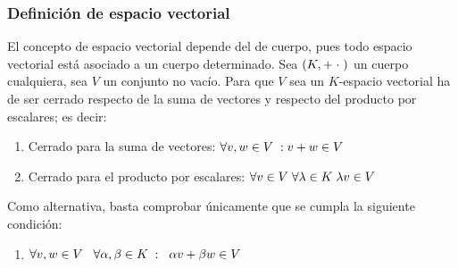 \documentclass[12pt]{article}
\begin{document}
\subsubsection{Definición de espacio vectorial}
\hspace{3mm}
El concepto de espacio vectorial depende del de cuerpo, pues todo espacio vectorial
está asociado a un cuerpo determinado. Sea $(K, + \hspace{1mm}\cdot \hspace{1mm})$
un cuerpo cualquiera, sea $V$ un conjunto no vacío. Para que $V$ sea un $K$-espacio vectorial
ha de ser cerrado respecto de la suma de vectores y respecto del producto por escalares; es decir:
\label{requisitos-espacio-vectorial}
\begin{enumerate}[label=\roman*)]
    \item Cerrado para la suma de vectores: $\forall v, w \in V \hspace{1mm} : v + w \in V$
    \item Cerrado para el producto por escalares: $\forall v \in V \hspace{1mm} \forall \lambda \in K
      \hspace{1mm} \lambda v \in V$
\end{enumerate}
Como alternativa, basta comprobar únicamente que se cumpla la siguiente condición:
\begin{enumerate}[label=$\hat{\roman*)}$]
    \item $\forall v,w \in V \hspace{3mm}
        \forall \alpha, \beta \in K \hspace{1mm} :
        \hspace{2mm}\alpha v + \beta w \in V$
\end{enumerate}
\end{document}
